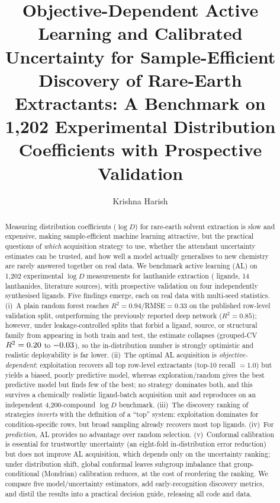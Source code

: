 \documentclass[journal=acsodf,manuscript=article]{achemso}
\author{Krishna Harish}
\affiliation{Lawrence E. Elkins High School, Missouri City, Texas, USA}
\title{Objective-Dependent Active Learning and Calibrated Uncertainty for
Sample-Efficient Discovery of Rare-Earth Extractants: A Benchmark on 1{,}202
Experimental Distribution Coefficients with Prospective Validation}
\begin{document}
\begin{abstract}
Measuring distribution coefficients ($\log D$) for rare-earth solvent extraction is
slow and expensive, making sample-efficient machine learning attractive, but the
practical questions of \emph{which} acquisition strategy to use, whether the
attendant uncertainty estimates can be trusted, and how well a model actually
generalises to new chemistry are rarely answered together on real data. We
benchmark active learning (AL) on 1{,}202 experimental $\log D$ measurements for
lanthanide extraction (\nLigands{} ligands, 14 lanthanides, \nSources{} literature
sources), with prospective validation on four independently synthesised ligands.
Five findings emerge, each on real data with multi-seed statistics. (i)~A plain
random forest reaches $R^2=0.94$/RMSE$=0.33$ on the published row-level validation
split, outperforming the previously reported deep network ($R^2=0.85$); however,
under leakage-controlled splits that forbid a ligand, source, or structural family
from appearing in both train and test, the estimate collapses (grouped-CV
$R^2=0.20{}$ to $-0.03{}$), so the in-distribution number is strongly
optimistic and realistic deployability is far lower. (ii)~The optimal AL acquisition
is \emph{objective-dependent}: exploitation recovers all top row-level extractants
(top-10 recall $=1.0$) but yields a biased, poorly predictive model, whereas
exploration/random gives the best predictive model but finds few of the best; no
strategy dominates both, and this survives a chemically realistic ligand-batch
acquisition unit and reproduces on an independent 4{,}200-compound $\log D$
benchmark. (iii)~The discovery ranking of strategies \emph{inverts} with the
definition of a ``top'' system: exploitation dominates for condition-specific rows,
but broad sampling already recovers most top ligands. (iv)~For \emph{prediction}, AL
provides no advantage over random selection. (v)~Conformal calibration is essential
for trustworthy uncertainty (an eight-fold in-distribution error reduction) but does
not improve AL acquisition, which depends only on the uncertainty ranking; under
distribution shift, global conformal leaves subgroup imbalance that group-conditional
(Mondrian) calibration reduces, at the cost of reordering the ranking. We compare
five model/uncertainty estimators, add early-recognition discovery metrics, and
distil the results into a practical decision guide, releasing all code and data.
\end{abstract}
\end{document}
